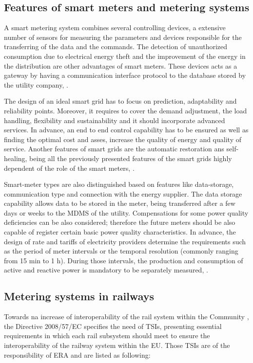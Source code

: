 \subsection{Features of smart meters and metering systems}

A smart metering system combines several controlling devices, a extensive number of sensors for measuring the parameters and devices responsible for the transferring of the data and the commands. The detection of unauthorized consumption due to electrical energy theft and the improvement of the energy in the distribution are other advantages of smart meters. These devices acts as a gateway by having a communication interface protocol to the database stored by the utility company, \cite{Reddy2014}.

The design of an ideal smart grid has to focus on prediction, adaptability and reliability points. Moreover, it requires to cover the demand adjustment, the load handling, flexibility and sustainability and it should incorporate advanced services. In advance, an end to end control capability has to be ensured as well as finding the optimal cost and asses, increase the quality of energy and quality of service. Another features of smart grids are the automatic restoration ans self-healing, being all the previously presented features of the smart grids highly dependent of the role of the smart meters, \cite{Mohassel2014}.

Smart-meter types are also distinguished based on features like data-storage, communication type and connection with the energy supplier. The data storage capability allows data to be stored in the meter, being transferred after a few days or weeks to the \ac{MDMS} of the utility. Compensations for some power quality deficiencies can be also considered; therefore the future meters should be also capable of register certain basic power quality characteristics. In advance, the design of rate and tariffs of electricity providers determine the requirements such as the period of meter intervals or the temporal resolution (commonly ranging from 15 min to 1 h). During those intervals, the production and consumption of active and reactive power is mandatory to be separately measured, \cite{Siano2014}.

\subsection{Metering systems in railways}

Towards na increase of interoperability of the rail system within the Community \cite{eur-lex2008}, the Directive 2008/57/EC specifies the need of  \ac{TSIs}, presenting essential requirements in which each rail subsystem should meet to ensure the interoperability of the railway system within the \ac{EU}. Those \ac{TSIs} are of the responsibility of \ac{ERA} and are listed as following:

